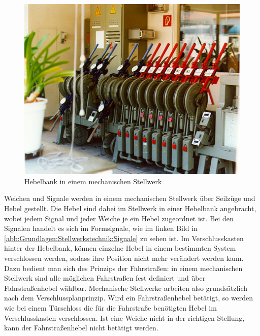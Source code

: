 \begin{figure}[H]
    \centering
    \includegraphics[width=.8\textwidth]{Assets/Images/2-Grundlagen/Mechanisches-Stellwerk-Hebelbank.jpg}
    \caption{Hebelbank in einem mechanischen Stellwerk~\cite{bib:stellwerke.de:Einheit}}\label{abb:Grundlagen:Stellwerkstechnik:Mechanische-Stellwerke:Hebelbank}
\end{figure}

Weichen und Signale werden in einem mechanischen Stellwerk über Seilzüge und Hebel gestellt. Die Hebel sind dabei im Stellwerk in einer Hebelbank angebracht, wobei jedem Signal und jeder Weiche je ein Hebel zugeordnet ist. Bei den Signalen handelt es sich im Formsignale, wie im linken Bild in \autoref{abb:Grundlagen:Stellwerkstechnik:Signale} zu sehen ist.
Im Verschlusskasten hinter der Hebelbank, können einzelne Hebel in einem bestimmten System verschlossen werden, sodass ihre Position nicht mehr verändert werden kann. Dazu bedient man sich des Prinzips der Fahrstraßen: in einem mechanischen Stellwerk sind alle möglichen Fahrstraßen fest definiert und über Fahrstraßenhebel wählbar. Mechanische Stellwerke arbeiten also grundsätzlich nach dem Verschlussplanprinzip. Wird ein Fahrstraßenhebel betätigt, so werden wie bei einem Türschloss die für die Fahrstraße benötigten Hebel im Verschlusskasten verschlossen. Ist eine Weiche nicht in der richtigen Stellung, kann der Fahrstraßenhebel nicht betätigt werden.~\cite*[][S.173 ff.]{bib:Sicherung-des-Schienenverkehrs}

